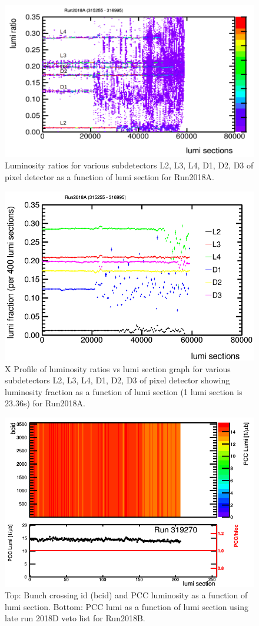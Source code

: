 \begin{figure}[H]
  \centering
  \includegraphics[width=0.52\columnwidth]{./2018A_lumiratio.png}
  \caption{Luminosity ratios for various subdetectors L2, L3, L4, D1, D2, D3 of pixel detector as a function of lumi section for Run2018A.}
  \label{fig:CMS}
\end{figure}



\begin{figure}[H]
  \centering
  \includegraphics[width=0.52\columnwidth]{./ProfileXcombined_new.png}
  \caption{X Profile of luminosity ratios vs lumi section graph for various subdetectors L2, L3, L4, D1, D2, D3 of pixel detector showing luminosity fraction as a function of lumi section (1 lumi section is 23.36s) for Run2018A.}
  \label{fig:CMS}
\end{figure}





\begin{figure}[H]
  \centering
  \includegraphics[width=0.52\columnwidth]{./319270.png}
  \caption{Top: Bunch crossing id (bcid) and PCC luminosity as a function of lumi section. Bottom: PCC lumi as a function of lumi section using late run 2018D veto list for Run2018B.}
  \label{fig:CMS}
\end{figure}


